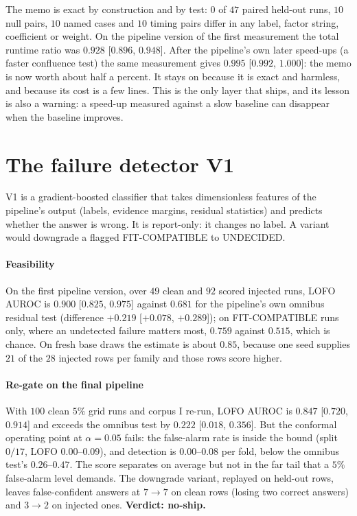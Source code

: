 \documentclass[11pt]{article}
\theoremstyle{plain}
\theoremstyle{definition}
\theoremstyle{remark}
\newcommand{\lab}[1]{\textsf{#1}}           %
\newcommand{\FC}{\lab{FIT-COMPATIBLE}}
\newcommand{\UND}{\lab{UNDECIDED}}
\begin{document}
The memo is exact by construction and by test: $0$ of $47$ paired held-out runs, $10$ null pairs, $10$ named cases and $10$ timing
pairs differ in any label, factor string, coefficient or weight. On the pipeline version of the first measurement the total runtime ratio
was $0.928$ [$0.896$, $0.948$]. After the pipeline's own later speed-ups (a faster confluence test) the same measurement gives $0.995$ [$0.992$, $1.000$]:
the memo is now worth about half a percent. It stays on because it is exact and harmless, and because its cost is a few lines.
This is the only layer that ships, and its lesson is also a warning: a speed-up measured against a slow baseline can disappear when the baseline improves.

\section{The failure detector V1}\label{sec:v1}
V1 is a gradient-boosted classifier that takes dimensionless features of the pipeline's output (labels, evidence margins,
residual statistics) and predicts whether the answer is wrong. It is report-only: it changes no label. A variant would downgrade
a flagged \FC{} to \UND.

\paragraph{Feasibility} On the first pipeline version, over $49$ clean and $92$ scored injected runs, LOFO AUROC is $0.900$ [$0.825$, $0.975$] against
$0.681$ for the pipeline's own omnibus residual test (difference $+0.219$ [$+0.078$, $+0.289$]); on \FC{} runs only, where an undetected failure
matters most, $0.759$ against $0.515$, which is chance. On fresh base draws the estimate is about $0.85$, because one seed supplies $21$ of the
$28$ injected rows per family and those rows score higher.

\paragraph{Re-gate on the final pipeline} With $100$ clean $5\%$ grid runs and corpus I re-run, LOFO AUROC is $0.847$ [$0.720$, $0.914$]
and exceeds the omnibus test by $0.222$ [$0.018$, $0.356$]. But the conformal operating point at $\alpha=0.05$ fails: the false-alarm rate is inside
the bound (split $0/17$, LOFO $0.00$--$0.09$), and detection is $0.00$--$0.08$ per fold, below the omnibus test's $0.26$--$0.47$. The score
separates on average but not in the far tail that a $5\%$ false-alarm level demands. The downgrade variant, replayed on held-out rows,
leaves false-confident answers at $7\to7$ on clean rows (losing two correct answers) and $3\to2$ on injected ones. \textbf{Verdict: no-ship.}
\end{document}
